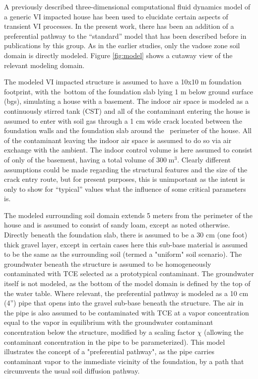 \documentclass[journal=esthag,manuscript=article]{achemso}
\begin{document}
A previously described three-dimensional computational fluid dynamics model of a generic VI impacted house has been used to elucidate certain aspects of transient VI processes.
In the present work, there has been an addition of a preferential pathway to the “standard” model that has been described before in publications by this group\cite{shen_influence_2013,yao_investigating_2017,yao_three-dimensional_2017}.
As in the earlier studies, only the vadose zone soil domain is directly modeled.
Figure \ref{fig:model} shows a cutaway view of the relevant modeling domain.\par

The modeled VI impacted structure is assumed to have a 10x10 m foundation footprint, with the bottom of the foundation slab lying 1 m below ground surface (bgs), simulating a house with a basement.
The indoor air space is modeled as a continuously stirred tank (CST)\cite{u.s._environmental_protection_agency_oswer_2015} and all of the contaminant entering the house is assumed to enter with soil gas through a 1 cm wide crack located between the foundation walls and the foundation slab around the  perimeter of the house.
All of the contaminant leaving the indoor air space is assumed to do so via air exchange with the ambient.
The indoor control volume is here assumed to consist of only of the basement, having a total volume of $300 \; \mathrm{m^3}$.
Clearly different assumptions could be made regarding the structural features and the size of the crack entry route, but for present purposes, this is unimportant as the intent is only to show for “typical” values what the influence of some critical parameters is.\par

The modeled surrounding soil domain extends 5 meters from the perimeter of the house and is assumed to consist of sandy loam, except as noted otherwise.
Directly beneath the foundation slab, there is assumed to be a 30 cm (one foot) thick gravel layer, except in certain cases here this sub-base material is assumed to be the same as the surrounding soil (termed a "uniform" soil scenario).
The groundwater beneath the structure is assumed to be homogeneously contaminated with TCE selected as a prototypical contaminant.
The groundwater itself is not modeled, as the bottom of the model domain is defined by the top of the water table.
Where relevant, the preferential pathway is modeled as a 10 cm (4”) pipe that opens into the gravel sub-base beneath the structure.
The air in the pipe is also assumed to be contaminated with TCE at a vapor concentration equal to the vapor in equilibrium with the groundwater contaminant concentration below the structure, modified by a scaling factor $\chi$ (allowing the contaminant concentration in the pipe to be parameterized).
This model illustrates the concept of a "preferential pathway", as the pipe carries contaminant vapor to the immediate vicinity of the foundation, by a path that circumvents the usual soil diffusion pathway.\par
\end{document}
